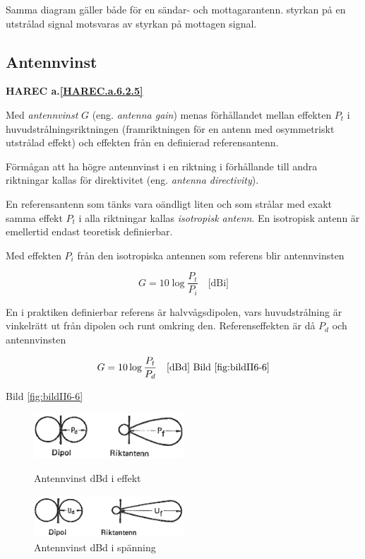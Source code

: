 Samma diagram gäller både för en sändar- och mottagarantenn. styrkan
på en utstrålad signal motsvaras av styrkan på mottagen signal.

\subsection{Antennvinst}
\textbf{
  HAREC a.\ref{HAREC.a.6.2.5}\label{myHAREC.a.6.2.5}
}

Med \emph{antennvinst} \(G\) (eng. \emph{antenna gain}) menas förhållandet
mellan effekten \(P_t\) i huvudstrålningsriktningen (framriktningen för en
antenn med osymmetriskt utstrålad effekt) och effekten från en definierad
referensantenn.

Förmågan att ha högre antennvinst i en riktning i förhållande till andra
riktningar kallas för direktivitet (eng. \emph{antenna directivity}).

En referensantenn som tänks vara oändligt liten och som strålar med exakt
samma effekt \(P_t\) i alla riktningar kallas \emph{isotropisk antenn}.
En isotropisk antenn är emellertid endast teoretisk definierbar.

Med effekten \(P_i\) från den isotropiska antennen som referens blir
antennvinsten

\[G = 10 \log\frac{P_t}{P_i} \quad \text{[dBi]}\]

En i praktiken definierbar referens är halvvågsdipolen, vars
huvudstrålning är vinkelrätt ut från dipolen och runt omkring den.
Referenseffekten är då \(P_d\) och antennvinsten

\[G = 10 \log\frac{P_t}{P_d} \quad \text{[dBd] Bild \ref{fig:bildII6-6}}\]

Bild \ref{fig:bildII6-6}

\begin{figure}
  \includegraphics[width=0.5\textwidth]{images/cropped_pdfs/bild_2_6-06.pdf}
  \caption{Antennvinst dBd i effekt}
  \label{fig:bildII6-6}

  \includegraphics[width=0.5\textwidth]{images/cropped_pdfs/bild_2_6-07.pdf}
  \caption{Antennvinst dBd i spänning}
  \label{fig:bildII6-7}
\end{figure}

